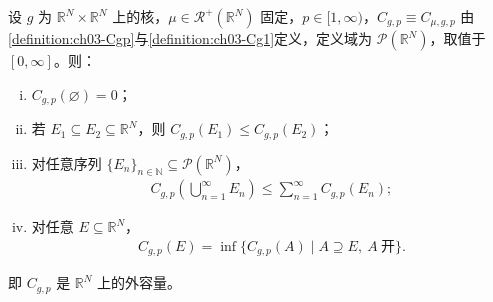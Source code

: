 \documentclass[../../main.tex]{subfiles}%
\begin{document}
\begin{theorem}\label{theorem:ch03-Cgp外容量}
设 $g$ 为 $\mathbb{R}^N\times\mathbb{R}^N$ 上的核，$\mu\in\mathscr{R}^+(\mathbb{R}^N)$ 固定，$p\in[1,\infty)$，$C_{g,p}\equiv C_{\mu,g,p}$ 由\cref{definition:ch03-Cgp}与\cref{definition:ch03-Cg1}定义，定义域为 $\mathcal{P}(\mathbb{R}^N)$，取值于 $[0,\infty]$。则：
\begin{enumerate}[(i)]
\item $C_{g,p}(\varnothing)=0$；
\item 若 $E_1\subseteq E_2\subseteq\mathbb{R}^N$，则 $C_{g,p}(E_1)\leqslant C_{g,p}(E_2)$；
\item 对任意序列 $\{E_n\}_{n\in\mathbb{N}}\subseteq\mathcal{P}(\mathbb{R}^N)$，
\begin{align*}
C_{g,p}\left(\bigcup_{n=1}^\infty E_n\right)\leqslant\sum_{n=1}^\infty C_{g,p}(E_n);
\end{align*}
\item 对任意 $E\subseteq\mathbb{R}^N$，
\begin{align}
C_{g,p}(E)=\inf\{C_{g,p}(A)\mid A\supseteq E,\ A\ \text{开}\}.\label{align:ch03-3.27}
\end{align}
\end{enumerate}
即 $C_{g,p}$ 是 $\mathbb{R}^N$ 上的外容量。
\end{theorem}
\end{document}
